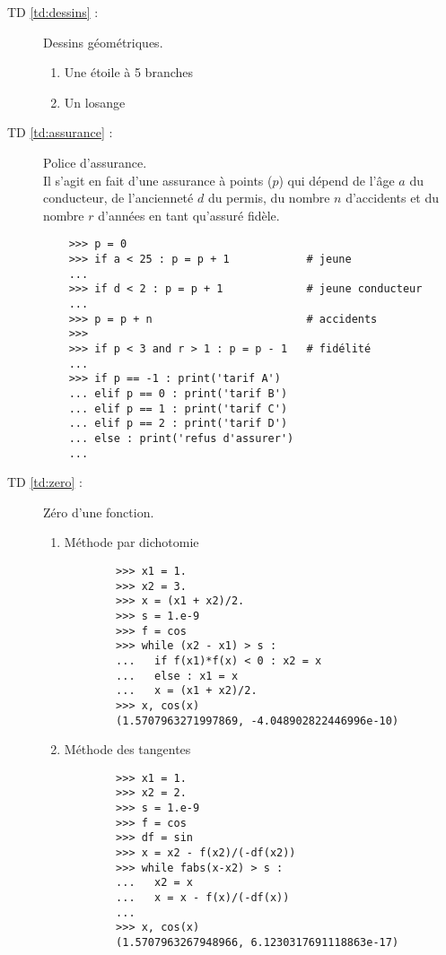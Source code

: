 \begin{description}
\item[TD \ref{td:dessins} :] Dessins géométriques.
	\begin{enumerate}
	\item Une étoile à 5 branches
	\item Un losange
	\end{enumerate}

\item[TD \ref{td:assurance} :] Police d'assurance.\\
	Il s'agit en fait d'une assurance à points ($p$) qui
	dépend de l'âge $a$ du conducteur, de l'ancienneté $d$ 
	du permis, du nombre $n$ d'accidents et du nombre $r$ d'années
	en tant qu'assuré fidèle.
	
	\begin{py}{12cm}
	\begin{verbatim}
	>>> p = 0
	>>> if a < 25 : p = p + 1            # jeune
	... 
	>>> if d < 2 : p = p + 1             # jeune conducteur
	... 
	>>> p = p + n                        # accidents
	>>> 
	>>> if p < 3 and r > 1 : p = p - 1   # fidélité
	... 
	>>> if p == -1 : print('tarif A')
	... elif p == 0 : print('tarif B')
	... elif p == 1 : print('tarif C')
	... elif p == 2 : print('tarif D')
	... else : print('refus d'assurer') 
	...
	\end{verbatim}
	\end{py}

\item[TD \ref{td:zero} :] Zéro d'une fonction.
	\begin{enumerate}
	\item Méthode par dichotomie

		\begin{py}{12cm}
		\begin{verbatim}
		>>> x1 = 1.
		>>> x2 = 3.
		>>> x = (x1 + x2)/2.
		>>> s = 1.e-9
		>>> f = cos
		>>> while (x2 - x1) > s :
		...   if f(x1)*f(x) < 0 : x2 = x
		...   else : x1 = x
		...   x = (x1 + x2)/2. 
		>>> x, cos(x)
		(1.5707963271997869, -4.048902822446996e-10)
		\end{verbatim}
		\end{py}

	\item Méthode des tangentes

		\begin{py}{12cm}
		\begin{verbatim}
		>>> x1 = 1.
		>>> x2 = 2.
		>>> s = 1.e-9
		>>> f = cos
		>>> df = sin
		>>> x = x2 - f(x2)/(-df(x2))
		>>> while fabs(x-x2) > s :
		...   x2 = x
		...   x = x - f(x)/(-df(x))
		...
		>>> x, cos(x)
		(1.5707963267948966, 6.1230317691118863e-17)
		\end{verbatim}
		\end{py}


\end{enumerate}
\end{description}
